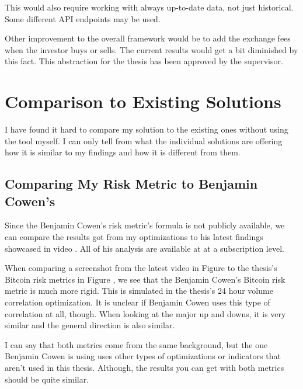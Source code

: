 This would also require working with always up-to-date data, not just historical. Some different API endpoints may be used.

Other improvement to the overall framework would be to add the exchange fees when the investor buys or sells. The current results would get a bit diminished by this fact. This abstraction for the thesis has been approved by the supervisor.

\section{Comparison to Existing Solutions}
I have found it hard to compare my solution to the existing ones without using the tool myself. I can only tell from what the individual solutions are offering how it is similar to my findings and how it is different from them.

\subsection{Comparing My Risk Metric to Benjamin Cowen's}
Since the Benjamin Cowen's risk metric's formula is not publicly available, we can compare the results got from my optimizations to his latest findings showcased in video \cite{youtube:bitcoin-risk-metric-latest}. All of his analysis are available at \cite{intothecryptoverse} at a subscription level.

When comparing a screenshot from the latest video \cite{youtube:bitcoin-risk-metric-latest} in Figure \cite{figure-cowen-screenshot} to the thesis's Bitcoin risk metrics in Figure \cite{figure-combined-bitcoin-riskmetric}, we see that the Benjamin Cowen's Bitcoin risk metric is much more rigid. This is simulated in the thesis's 24 hour volume correlation optimization. It is unclear if Benjamin Cowen uses this type of correlation at all, though. When looking at the major up and downs, it is very similar and the general direction is also similar.

I can say that both metrics come from the same background, but the one Benjamin Cowen is using uses other types of optimizations or indicators that aren't used in this thesis. Although, the results you can get with both metrics should be quite similar.


